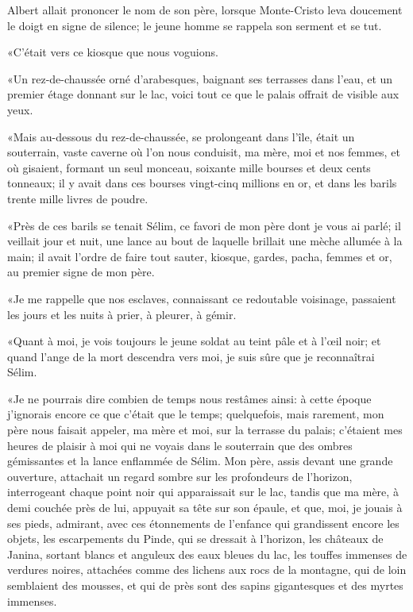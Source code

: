 Albert allait prononcer le nom de son père, lorsque Monte-Cristo leva doucement le doigt en signe de silence; le jeune homme se rappela son serment et se tut. 

«C'était vers ce kiosque que nous voguions. 

«Un rez-de-chaussée orné d'arabesques, baignant ses terrasses dans l'eau, et un premier étage donnant sur le lac, voici tout ce que le palais offrait de visible aux yeux. 

«Mais au-dessous du rez-de-chaussée, se prolongeant dans l'île, était un souterrain, vaste caverne où l'on nous conduisit, ma mère, moi et nos femmes, et où gisaient, formant un seul monceau, soixante mille bourses et deux cents tonneaux; il y avait dans ces bourses vingt-cinq millions en or, et dans les barils trente mille livres de poudre. 

«Près de ces barils se tenait Sélim, ce favori de mon père dont je vous ai parlé; il veillait jour et nuit, une lance au bout de laquelle brillait une mèche allumée à la main; il avait l'ordre de faire tout sauter, kiosque, gardes, pacha, femmes et or, au premier signe de mon père. 

«Je me rappelle que nos esclaves, connaissant ce redoutable voisinage, passaient les jours et les nuits à prier, à pleurer, à gémir. 

«Quant à moi, je vois toujours le jeune soldat au teint pâle et à l'œil noir; et quand l'ange de la mort descendra vers moi, je suis sûre que je reconnaîtrai Sélim. 

«Je ne pourrais dire combien de temps nous restâmes ainsi: à cette époque j'ignorais encore ce que c'était que le temps; quelquefois, mais rarement, mon père nous faisait appeler, ma mère et moi, sur la terrasse du palais; c'étaient mes heures de plaisir à moi qui ne voyais dans le souterrain que des ombres gémissantes et la lance enflammée de Sélim. Mon père, assis devant une grande ouverture, attachait un regard sombre sur les profondeurs de l'horizon, interrogeant chaque point noir qui apparaissait sur le lac, tandis que ma mère, à demi couchée près de lui, appuyait sa tête sur son épaule, et que, moi, je jouais à ses pieds, admirant, avec ces étonnements de l'enfance qui grandissent encore les objets, les escarpements du Pinde, qui se dressait à l'horizon, les châteaux de Janina, sortant blancs et anguleux des eaux bleues du lac, les touffes immenses de verdures noires, attachées comme des lichens aux rocs de la montagne, qui de loin semblaient des mousses, et qui de près sont des sapins gigantesques et des myrtes immenses. 

